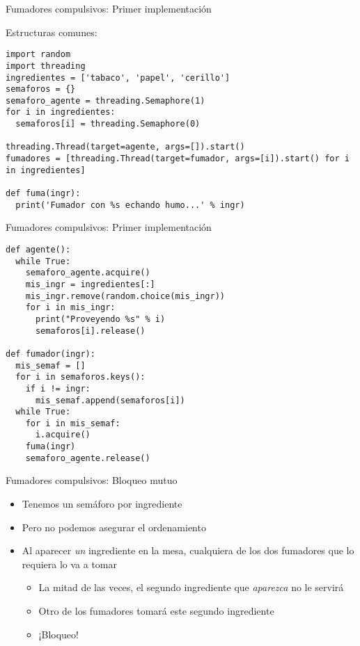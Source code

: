 \documentclass[presentation]{beamer}
\begin{document}
\begin{frame}[label={sec:org8bb8e7c},fragile]{Fumadores compulsivos: Primer implementación}
 \begin{center}
Estructuras comunes:
\end{center}
\begin{verbatim}
import random
import threading
ingredientes = ['tabaco', 'papel', 'cerillo']
semaforos = {}
semaforo_agente = threading.Semaphore(1)
for i in ingredientes:
  semaforos[i] = threading.Semaphore(0)

threading.Thread(target=agente, args=[]).start()
fumadores = [threading.Thread(target=fumador, args=[i]).start() for i in ingredientes]

def fuma(ingr):
  print('Fumador con %s echando humo...' % ingr)
\end{verbatim}
\end{frame}

\begin{frame}[label={sec:orga8502bc},fragile]{Fumadores compulsivos: Primer implementación}
 \begin{verbatim}
def agente():
  while True:
    semaforo_agente.acquire()
    mis_ingr = ingredientes[:]
    mis_ingr.remove(random.choice(mis_ingr))
    for i in mis_ingr:
      print("Proveyendo %s" % i)
      semaforos[i].release()

def fumador(ingr):
  mis_semaf = []
  for i in semaforos.keys():
    if i != ingr:
      mis_semaf.append(semaforos[i])
  while True:
    for i in mis_semaf:
      i.acquire()
    fuma(ingr)
    semaforo_agente.release()
\end{verbatim}
\end{frame}

\begin{frame}[label={sec:org4a2a774}]{Fumadores compulsivos: Bloqueo mutuo}
\begin{itemize}
\item Tenemos un semáforo por ingrediente
\item Pero no podemos asegurar el ordenamiento
\item Al aparecer \emph{un} ingrediente en la mesa, cualquiera de los dos
fumadores que lo requiera lo va a tomar
\begin{itemize}
\item La mitad de las veces, el segundo ingrediente que \emph{aparezca} no
le servirá
\item Otro de los fumadores tomará este segundo ingrediente
\item ¡Bloqueo!
\end{itemize}
\end{itemize}
\end{frame}
\end{document}
